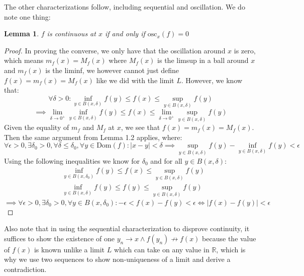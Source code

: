 \documentclass[10pt,letterpaper]{article} %
\newtheorem{lem}{Lemma}[section]
\begin{document}
The other characterizations follow, including sequential and oscillation. We do note one thing:
\begin{lem}
$f$ is continuous at $x$ if and only if $\text{osc}_x(f) = 0$
\end{lem}
\begin{proof}
In proving the converse, we only have that the oscillation around $x$ is zero, which means $m_f(x) = M_f(x)$ where $M_f(x)$ is the limsup in a ball around $x$ and $m_f(x)$ is the liminf, we however cannot just define $f(x) = m_f(x) = M_f(x)$ like we did with the limit $L$. However, we know that:
\begin{equation*}
  \forall \delta > 0: \inf_{y \in B(x, \delta)}f(y) \leqslant f(x) \leqslant \sup_{y \in B(x, \delta)}f(y)
\end{equation*}
\begin{equation*}
\implies \lim_{\delta \xrightarrow{} 0^+}\inf_{y \in B(x, \delta)}f(y) \leqslant f(x) \leqslant \lim_{\delta \xrightarrow{} 0^+}\sup_{y \in B(x, \delta)}f(y)
\end{equation*}
Given the equality of $m_f$ and $M_f$ at $x$, we see that $f(x) = m_f(x) = M_f(x)$. Then the same argument from Lemma 1.2 applies, where:
\begin{equation*}
\forall \epsilon > 0, \exists \delta_0 >0, \forall \delta \leqslant \delta_0, \forall y \in \text{Dom}(f): |x-y| < \delta \implies \sup_{y \in B(x, \delta)}f(y) - \inf_{y \in B(x, \delta)}f(y) < \epsilon
\end{equation*}
Using the following inequalities we know for $\delta_0$ and for all $y \in B(x, \delta)$:
\begin{align*}
&\inf_{y \in B(x, \delta_0)}f(y) \leqslant f(x) \leqslant \sup_{y \in B(x, \delta)}f(y)\\
&\inf_{y \in B(x, \delta)}f(y) \leqslant f(y) \leqslant \sup_{y \in B(x, \delta)}f(y)
\end{align*}
\begin{equation*}
  \implies \forall \epsilon > 0, \exists \delta_0 > 0, \forall y \in B(x, \delta_0): - \epsilon < f(x) - f(y) < \epsilon \iff |f(x) - f(y)| < \epsilon
\end{equation*}
\end{proof}
Also note that in using the sequential characterization to disprove continuity, it suffices to show the existence of one $y_n \xrightarrow{} x \land f(y_n) \nrightarrow f(x)$ because the value of $f(x)$ is known unlike a limit $L$ which can take on any value in $\mathbb{R}$, which is why we use two sequences to show non-uniqueness of a limit and derive a contradiction.
\end{document}
